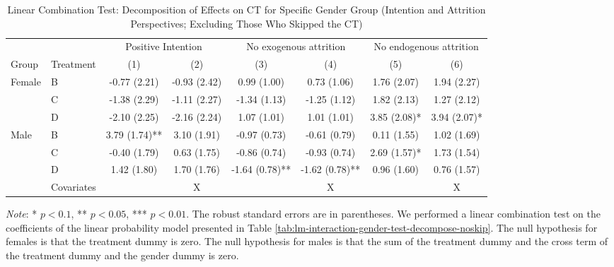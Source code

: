 \documentclass[12pt, a4paper]{article}
\begin{document}
\begin{table}[H]

\caption{\label{tab:lh-interaction-gender-test-decompose-noskip}Linear Combination Test: Decomposition of Effects on CT for Specific Gender Group (Intention and Attrition Perspectives; Excluding Those Who Skipped the CT)}
\centering
\fontsize{8}{10}\selectfont
\begin{threeparttable}
\begin{tabular}[t]{llcccccc}
\toprule
\multicolumn{2}{c}{ } & \multicolumn{2}{c}{Positive Intention} & \multicolumn{2}{c}{No exogenous attrition} & \multicolumn{2}{c}{No endogenous attrition} \\
\cmidrule(l{3pt}r{3pt}){3-4} \cmidrule(l{3pt}r{3pt}){5-6} \cmidrule(l{3pt}r{3pt}){7-8}
Group & Treatment & (1) & (2) & (3) & (4) & (5) & (6)\\
\midrule
Female & B & -0.77 (2.21) & -0.93 (2.42) & 0.99 (1.00) & 0.73 (1.06) & 1.76 (2.07) & 1.94 (2.27)\\
 & C & -1.38 (2.29) & -1.11 (2.27) & -1.34 (1.13) & -1.25 (1.12) & 1.82 (2.13) & 1.27 (2.12)\\
 & D & -2.10 (2.25) & -2.16 (2.24) & 1.07 (1.01) & 1.01 (1.01) & 3.85 (2.08)* & 3.94 (2.07)*\\
Male & B & 3.79 (1.74)** & 3.10 (1.91) & -0.97 (0.73) & -0.61 (0.79) & 0.11 (1.55) & 1.02 (1.69)\\
 & C & -0.40 (1.79) & 0.63 (1.75) & -0.86 (0.74) & -0.93 (0.74) & 2.69 (1.57)* & 1.73 (1.54)\\
 & D & 1.42 (1.80) & 1.70 (1.76) & -1.64 (0.78)** & -1.62 (0.78)** & 0.96 (1.60) & 0.76 (1.57)\\
\midrule
 & Covariates &  & X &  & X &  & X\\
\bottomrule
\end{tabular}
\begin{tablenotes}
\item \emph{Note}: * $p < 0.1$, ** $p < 0.05$, *** $p < 0.01$. The robust standard errors are in parentheses. We performed a linear combination test on the coefficients of the linear probability model presented in Table \ref{tab:lm-interaction-gender-test-decompose-noskip}. The null hypothesis for females is that the treatment dummy is zero. The null hypothesis for males is that the sum of the treatment dummy and the cross term of the treatment dummy and the gender dummy is zero.
\end{tablenotes}
\end{threeparttable}
\end{table}
\end{document}
